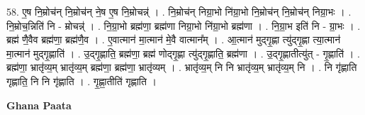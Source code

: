\documentclass[17pt]{extarticle}
\begin{document}
58. ए॒ष नि॒म्रोच॑न् नि॒म्रोच॑न् ने॒ष ए॒ष नि॒म्रोचन्न्॑ । . नि॒म्रोच॑न् निग्रा॒भो नि॑ग्रा॒भो नि॒म्रोच॑न् नि॒म्रोच॑न् निग्रा॒भः । . नि॒म्रोच॒न्निति॑ नि - म्रोचन्न्॑ । . नि॒ग्रा॒भो ब्रह्म॑णा॒ ब्रह्म॑णा निग्रा॒भो नि॑ग्रा॒भो ब्रह्म॑णा । . नि॒ग्रा॒भ इति॑ नि - ग्रा॒भः । . ब्रह्म॑ णै॒वैव ब्रह्म॑णा॒ ब्रह्म॑णै॒व । . ए॒वात्मान॑ मा॒त्मान॑ मे॒वै वात्मान᳚म् । . आ॒त्मान॑ मुद्‍गृ॒ह्णा त्यु॑द्‍गृ॒ह्णा त्या॒त्मान॑ मा॒त्मान॑ मुद्‍गृ॒ह्णाति॑ । . उ॒द्‍गृ॒ह्णाति॒ ब्रह्म॑णा॒ ब्रह्म॑ णोद्‍गृ॒ह्णा त्यु॑द्‍गृ॒ह्णाति॒ ब्रह्म॑णा । . उ॒द्‍गृ॒ह्णातीत्यु॑त् - गृ॒ह्णाति॑ । . ब्रह्म॑णा॒ भ्रातृ॑व्य॒म् भ्रातृ॑व्य॒म् ब्रह्म॑णा॒ ब्रह्म॑णा॒ भ्रातृ॑व्यम् । . भ्रातृ॑व्य॒म् नि नि भ्रातृ॑व्य॒म् भ्रातृ॑व्य॒म् नि । . नि गृ॑ह्णाति गृह्णाति॒ नि नि गृ॑ह्णाति । . गृ॒ह्णा॒तीति॑ गृह्णाति । \newline

\textbf{Ghana Paata } \newline
\end{document}
